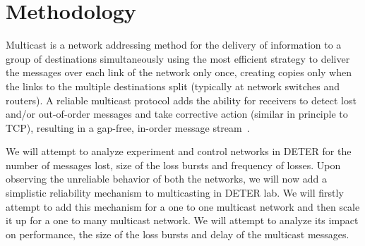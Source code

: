 \documentclass[11pt]{article}
\begin{document}
\section{Methodology} 
\label{sec:approach}
Multicast is a network addressing method for the delivery of information to a group of destinations simultaneously using the most efficient strategy to deliver the messages over each link of the network only once, creating copies only when the links to the multiple destinations split (typically at network switches and routers). A reliable multicast protocol adds the ability for receivers to detect lost and/or out-of-order messages and take corrective action (similar in principle to TCP), resulting in a gap-free, in-order message stream~\cite{Code}.

We will attempt to analyze experiment and control networks in DETER for the number of messages lost, size of the loss bursts and frequency of losses. Upon observing the unreliable behavior of both the networks, we will now add a simplistic reliability mechanism to multicasting in DETER lab. We will firstly attempt to add this mechanism for a one to one multicast network and then scale it up for a one to many multicast network. We will attempt to analyze its impact on performance, the size of the loss bursts and delay of the multicast messages.
\end{document}
